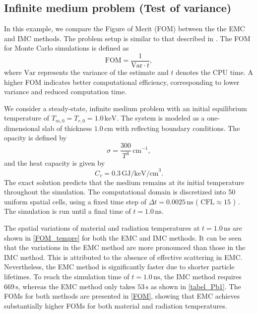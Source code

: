 \documentclass[preprint,12pt]{elsarticle}
\theoremstyle{definition}
\theoremstyle{plain}
\numberwithin{equation}{section}
\numberwithin{algorithm}{section}
\newcounter{eq_count}
\newcounter{tab_count}
\begin{document}
\subsection{Infinite medium problem (Test of variance)} \label{Pb.1}
In this example, we compare the Figure of Merit (FOM) between the the EMC and IMC methods. The problem setup is similar to that described in \cite{mcclarren2009modified}. The FOM for Monte Carlo simulations is defined as
\begin{equation*}
    \text{FOM} = \frac{1}{\text{Var} \cdot t},
\end{equation*}
where $\text{Var}$ represents the variance of the estimate and $t$ denotes the CPU time. A higher FOM indicates better computational efficiency, corresponding to lower variance and reduced computation time.

We consider a steady-state, infinite medium problem with an initial equilibrium temperature of $T_{m, 0} = T_{r, 0} = 1.0 \, \text{keV}$. The system is modeled as a one-dimensional slab of thickness $1.0 \, \text{cm}$ with reflecting boundary conditions. The opacity is defined by
\begin{equation*}
	\sigma = \frac{300}{T^3}\,\text{cm}^{-1},
\end{equation*}
and the heat capacity is given by
\begin{equation*}
	C_v = 0.3 \, \text{GJ/keV/cm}^3.
\end{equation*}
The exact solution predicts that the medium remains at its initial temperature throughout the simulation. The computational domain is discretized into 50 uniform spatial cells, using a fixed time step of $\Delta t = 0.0025 \, \text{ns}$ ( $\text{CFL} \approx 15 $  ) .  The simulation is run until a final time of $t = 1.0 \,\text{ns}$.

The spatial variations of material and radiation temperatures at $t = 1.0\,\text{ns}$ are shown in \autoref{FOM_tempre} for both the EMC and IMC methods. It can be seen that the variations in the EMC method are more pronounced  than those in the IMC method. This is attributed to the absence of effective scattering in EMC. Nevertheless, the EMC method is significantly faster due to shorter particle lifetimes. To reach the simulation time of $t = 1.0\,\text{ns}$, the IMC method requires $669 \,\text{s}$, whereas the EMC method only takes $53 \,\text{s}$ as shown in \autoref{tabel_Pb1}. The FOMs for both methods are presented in \autoref{FOM}, showing that EMC achieves substantially higher FOMs for both material and radiation temperatures.
\end{document}
